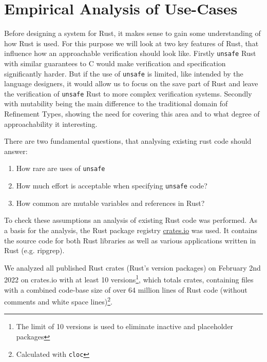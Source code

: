 \documentclass{book}
\newcommand{\code}[1]{\texttt{#1}}
\theoremstyle{definition}
\begin{document}
\chapter{Empirical Analysis of Use-Cases}

Before designing a system for Rust, it makes sense to gain some understanding of how Rust is used. For this purpose we will look at two key features of Rust, that influence how an approachable verification should look like.
Firstly \code{unsafe} Rust with similar guarantees to C would make verification and specification significantly harder. But if the use of \code{unsafe} is limited, like intended by the language designers, it would allow us to focus on the save part of Rust and leave the verification of \code{unsafe} Rust to more complex verification systems.
Secondly with mutability being the main difference to the traditional domain fof Refinement Types, showing the need for covering this area and to what degree of approachability it interesting.

There are two fundamental questions, that analysing existing rust code should answer: 
\begin{enumerate}
  \item \label{enum:hypothesis-unsafe-rare} How rare are uses of \code{unsafe}
  \item \label{enum:hypothesis-unsafe-lib} How much effort is acceptable when specifying \code{unsafe} code?
  \item \label{enum:hypothesis-mut} How common are mutable variables and references in Rust?
\end{enumerate}

To check these assumptions an analysis of existing Rust code was performed. As a basis for the analysis, the Rust package registry \href{https://www.crates.io}{crates.io} was used. It contains the source code for both Rust libraries as well as various applications written in Rust (e.g. ripgrep). 

We analyzed all published Rust crates (Rust's version packages) on February 2nd 2022 on crates.io with at least 10 versions\footnote{The limit of 10 versions is used to eliminate inactive and placeholder packages}, which totals  crates, containing  files with a combined code-base size of over 64 million lines of Rust code (without comments and white space lines)\footnote{Calculated with \texttt{cloc}}. 
\end{document}
